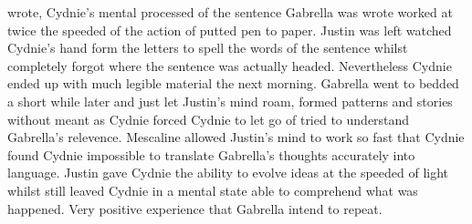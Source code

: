 \documentclass[12pt]{book}
\begin{document}
wrote, Cydnie's mental processed of the sentence Gabrella was wrote worked at twice the speeded of the action of putted pen to paper. Justin was left watched Cydnie's hand form the letters to spell the words of the sentence whilst completely forgot where the sentence was actually headed. Nevertheless Cydnie ended up with much legible material the next morning. Gabrella went to bedded a short while later and just let Justin's mind roam, formed patterns and stories without meant as Cydnie forced Cydnie to let go of tried to understand Gabrella's relevence. Mescaline allowed Justin's mind to work so fast that Cydnie found Cydnie impossible to translate Gabrella's thoughts accurately into language. Justin gave Cydnie the ability to evolve ideas at the speeded of light whilst still leaved Cydnie in a mental state able to comprehend what was happened. Very positive experience that Gabrella intend to repeat.
\end{document}
